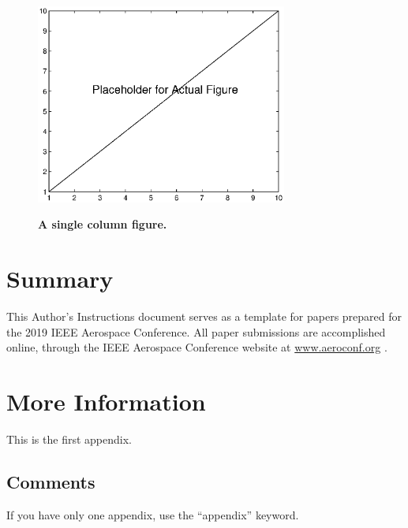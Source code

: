 \documentclass[twocolumn,letterpaper]{IEEEAerospaceCLS}  %
\begin{document}
\begin{figure}\label{OneColumn}
\centering
\includegraphics[width=3.25in]{placeholder.eps}\\
\caption{\textbf{ A single column figure.}}
\end{figure}


\section{Summary}
This Author's Instructions document serves as a template for papers prepared for the 2019 IEEE Aerospace Conference. All paper submissions are accomplished online, through the IEEE Aerospace Conference website at \underline {www.aeroconf.org} \cite{AeroConf}.





\appendices{}              %

\section{More Information}        %
This is the first appendix. 

\subsection{Comments}
If you have only one appendix, use the ``appendix'' keyword.
\end{document}
